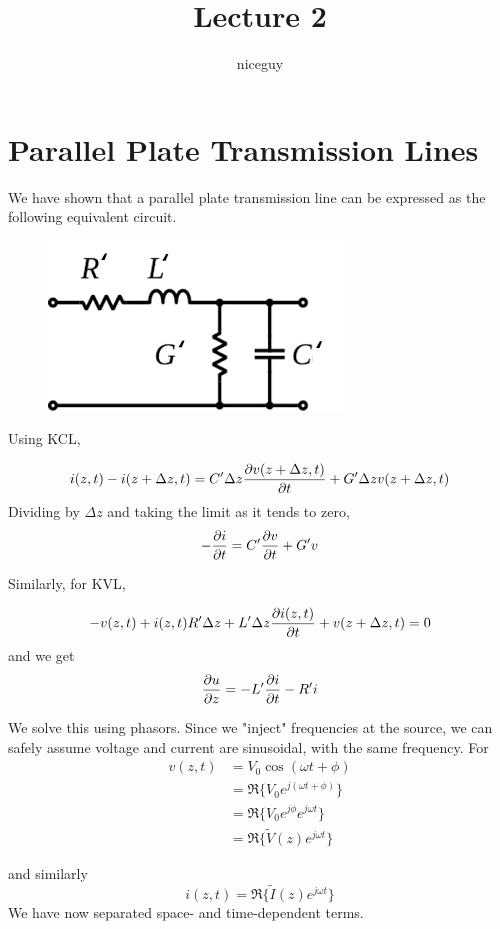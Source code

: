 \documentclass[12pt]{article}
\title{Lecture 2}
\author{niceguy}
\begin{document}
\maketitle

\section{Parallel Plate Transmission Lines}

We have shown that a parallel plate transmission line can be expressed as the following equivalent circuit.

\begin{figure}[h!]
    \begin{center}
        \includegraphics[scale=0.25]{Untitled.png}
    \end{center}
\end{figure}

Using KCL,

$$i(z,t) - i(z+\Delta z,t) = C'\Delta z \frac{\partial v(z+\Delta z, t)}{\partial t} + G'\Delta z v(z+\Delta z, t)$$
Dividing by $\Delta z$ and taking the limit as it tends to zero,
$$-\frac{\partial i}{\partial t} = C'\frac{\partial v}{\partial t} + G'v$$

Similarly, for KVL,

$$-v(z,t) + i(z,t)R'\Delta z + L'\Delta z \frac{\partial i(z,t)}{\partial t} + v(z+\Delta z, t) = 0$$
and we get
$$\frac{\partial u}{\partial z} = -L'\frac{\partial i}{\partial t} - R'i$$

We solve this using phasors. Since we "inject" frequencies at the source, we can safely assume voltage and current are sinusoidal, with the same frequency. For
\begin{align*}
    v(z,t) &= V_0\cos(\omega t + \phi) \\
           &= \Re\{V_0e^{j(\omega t + \phi)}\} \\
           &= \Re\{V_0e^{j\phi}e^{j\omega t}\} \\
           &= \Re\{\tilde V(z)e^{j\omega t}\}
\end{align*}

and similarly
$$i(z,t) = \Re\{\tilde I(z)e^{j\omega t}\}$$
We have now separated space- and time-dependent terms.
\end{document}
